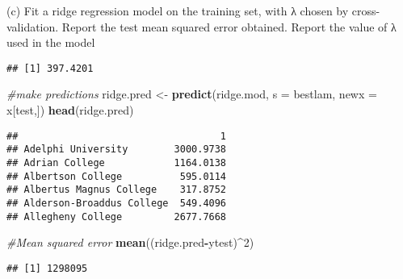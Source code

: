 \documentclass[
  ignorenonframetext,
]{beamer}
\newenvironment{Shaded}{\begin{snugshade}}{\end{snugshade}}
\newcommand{\CommentTok}[1]{\textcolor[rgb]{0.56,0.35,0.01}{\textit{#1}}}
\newcommand{\DataTypeTok}[1]{\textcolor[rgb]{0.13,0.29,0.53}{#1}}
\newcommand{\DecValTok}[1]{\textcolor[rgb]{0.00,0.00,0.81}{#1}}
\newcommand{\KeywordTok}[1]{\textcolor[rgb]{0.13,0.29,0.53}{\textbf{#1}}}
\newcommand{\NormalTok}[1]{#1}
\newcommand{\OperatorTok}[1]{\textcolor[rgb]{0.81,0.36,0.00}{\textbf{#1}}}
\newcommand{\StringTok}[1]{\textcolor[rgb]{0.31,0.60,0.02}{#1}}
\begin{document}
\begin{frame}[fragile]{(c) Fit a ridge regression model on the training
set, with λ chosen by cross-validation. Report the test mean squared
error obtained. Report the value of λ used in the model}
\begin{verbatim}
## [1] 397.4201
\end{verbatim}

\begin{Shaded}
\begin{Highlighting}[]
\CommentTok{#make predictions}
\NormalTok{ridge.pred <-}\StringTok{ }\KeywordTok{predict}\NormalTok{(ridge.mod, }\DataTypeTok{s =}\NormalTok{ bestlam, }\DataTypeTok{newx =}\NormalTok{ x[test,])}
\KeywordTok{head}\NormalTok{(ridge.pred)}
\end{Highlighting}
\end{Shaded}

\begin{verbatim}
##                                   1
## Adelphi University        3000.9738
## Adrian College            1164.0138
## Albertson College          595.0114
## Albertus Magnus College    317.8752
## Alderson-Broaddus College  549.4096
## Allegheny College         2677.7668
\end{verbatim}

\begin{Shaded}
\begin{Highlighting}[]
\CommentTok{#Mean squared error}
\KeywordTok{mean}\NormalTok{((ridge.pred}\OperatorTok{-}\NormalTok{ytest)}\OperatorTok{^}\DecValTok{2}\NormalTok{)}
\end{Highlighting}
\end{Shaded}

\begin{verbatim}
## [1] 1298095
\end{verbatim}

\end{frame}
\end{document}
